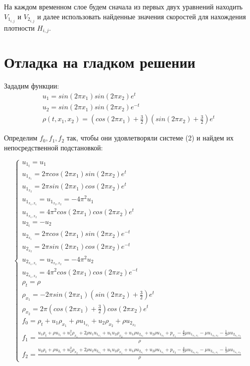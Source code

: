 \documentclass[specialist,subf,href,colorlinks=true,12pt
,times,mtpro,specialist
]{disser}
\begin{document}
На каждом временном слое будем сначала из первых двух уравнений находить $V_{1_{i,j}}$ и $V_{2_{i,j}}$ и далее использовать найденные значения скоростей для нахождения плотности $H_{i,j}$.

\section {Отладка на гладком решении}

Зададим функции:
\begin{gather*}
u_1 = sin(2\pi x_1)sin(2\pi x_2)e^t \\
u_2 = sin(2\pi x_1)sin(2\pi x_2)e^{-t} \\
\rho(t, x_1, x_2) = (cos(2\pi x_1) + \frac{3}{2})(sin(2\pi x_2) + \frac{3}{2})e^t
\end{gather*}

Определим $f_0, f_1, f_2$ так, чтобы они удовлетворяли системе (2) и найдем их непосредственной подстановкой:

\begin{equation}
 \begin{cases}
   u_{1_t} = u_1 \\
   u_{1_{x_1}} = 2\pi cos(2\pi x_1) sin(2\pi x_2)e^t \\
   u_{1_{x_2}} = 2\pi sin(2\pi x_1) cos(2\pi x_2)e^t \\
   u_{1_{x_1, x_1}} = u_{1_{x_2, x_2}} = -4\pi^2 u_1 \\
   u_{1_{x_1, x_2}} = 4\pi^2 cos(2\pi x_1) cos(2\pi x_2)e^t \\
   u_{2_t} = -u_2 \\
   u_{2_{x_1}} = 2\pi cos(2\pi x_1) sin(2\pi x_2)e^{-t} \\
   u_{2_{x_2}} = 2\pi sin(2\pi x_1) cos(2\pi x_2)e^{-t} \\
   u_{2_{x_1, x_1}} = u_{2_{x_2, x_2}} = -4\pi^2 u_2 \\
   u_{2_{x_1, x_2}} = 4\pi^2 cos(2\pi x_1) cos(2\pi x_2)e^{-t} \\
   \rho_t = \rho \\
   \rho_{x_1} = -2\pi sin(2\pi x_1)(sin(2\pi x_2) + \frac{3}{2})e^t \\
   \rho_{x_2} = 2\pi (cos(2\pi x_1) + \frac{3}{2})cos(2\pi x_2)e^t \\
   f_0 = \rho_t + u_1 \rho_{x_1} + \rho u_{1_{x_1}} + u_2 \rho_{x_2} + \rho u_{2_{x_2}} \\
   f_1 = \frac{u_1 \rho_t + \rho u_{1_t} + u_1^2 \rho_{x_1} + 2\rho u_1 u_{1_{x_1}} + u_1 u_2 \rho_{x_2} + u_1 \rho u_{2_{x_2}} + u_2 \rho u_{1_{x_2}} + p_{x_1} - \frac{4}{3}\mu u_{1_{x_1, x_1}} - \mu u_{1_{x_2, x_2}} - \frac{1}{3} \mu u_{2_{x_1, x_2}}}{\rho} \\
   f_2 = \frac{u_2 \rho_t + \rho u_{2_t} + u_2^2 \rho_{x_2} + 2\rho u_2 u_{2_{x_2}} + u_1 u_2 \rho_{x_1} + u_1 \rho u_{2_{x_1}} + u_2 \rho u_{1_{x_1}} + p_{x_2} - \frac{4}{3}\mu u_{2_{x_2, x_2}} - \mu u_{2_{x_1, x_1}} - \frac{1}{3} \mu u_{1_{x_1, x_2}}}{\rho}
 \end{cases}
\end{equation} 
\end{document}
